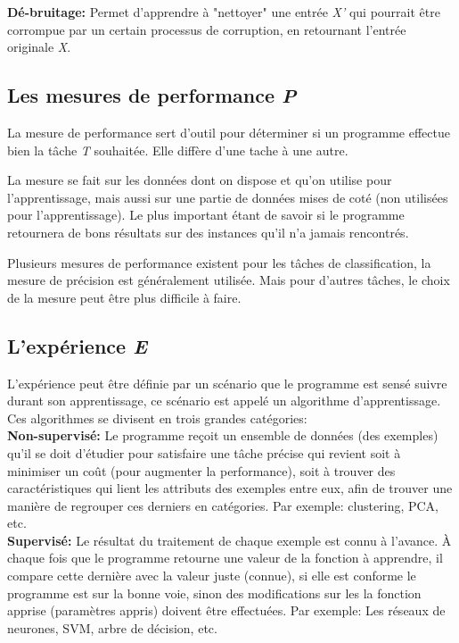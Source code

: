 \textbf{Dé-bruitage:} Permet d'apprendre à "nettoyer" une entrée \textit{X'} qui pourrait être corrompue par un certain processus de corruption, en retournant l'entrée originale \textit{X}.\\

\subsection{Les mesures de performance \textit{P}}

	La mesure de performance sert d'outil pour déterminer si un programme effectue bien la tâche \textit{T} souhaitée. Elle diffère d'une tache à une autre.
	
	La mesure se fait sur les données dont on dispose et qu'on utilise pour l'apprentissage, mais aussi sur une partie de données mises de coté (non utilisées pour l'apprentissage). Le plus important étant de savoir si le programme retournera de bons résultats sur des instances qu'il n'a jamais rencontrés.   

	Plusieurs mesures de performance existent pour les tâches de classification, la mesure de précision est généralement utilisée. Mais pour d'autres tâches, le choix de la mesure peut être plus difficile à faire.

\subsection{L’expérience \textit{E}}

	L'expérience peut être définie par un scénario que le programme est sensé suivre durant son apprentissage, ce scénario est appelé un algorithme d'apprentissage. Ces algorithmes se divisent en trois grandes catégories:\\
	
\textbf{Non-supervisé:} Le programme reçoit un ensemble de données (des exemples) qu'il se doit d'étudier pour satisfaire une tâche précise qui revient soit à minimiser un coût (pour augmenter la performance), soit à trouver des caractéristiques qui lient les attributs des exemples entre eux, afin de trouver une manière de regrouper ces derniers en catégories. Par exemple: clustering, PCA, etc.\\

\textbf{Supervisé:} Le résultat du traitement de chaque exemple est connu à l'avance. À chaque fois que le programme retourne une valeur de la fonction à apprendre, il compare cette dernière avec la valeur juste (connue), si elle est conforme le programme est sur la bonne voie, sinon des modifications sur les la fonction apprise (paramètres appris) doivent être effectuées. Par exemple: Les réseaux de neurones, SVM, arbre de décision, etc.\\

